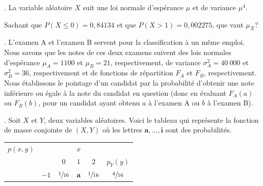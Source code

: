 \begin{questions}


\newpage . \newpage
\question[10] \label{CDF} La variable aléatoire $X$ suit une loi normale d'espérance $\mu$ et de variance $\mu^4$.

Sachant que $P(X\leq 0)= 0,84134$ et que $P(X>1)=0,002275$, que vaut $\mu_X$?

\newpage . \newpage
\question
L'examen A et l'examen B servent pour la classification à un même emploi. 
Nous savons que les notes de ces deux examens suivent des lois normales d'espérance $\mu_{A}=1100$ et $\mu_{B}=21$, respectivement, de variance $\sigma^2_{A}=40\ 000$ et $\sigma^2_{B}=36$, respectivement et de fonctions de répartition $F_A$ et $F_B$, respectivement.
Nous établissons le pointage d'un candidat par la probabilité d'obtenir une note inférieure ou égale à la note du candidat en question (donc en évaluant $F_A(a)$ ou $F_B(b)$, pour un candidat ayant obtenu $a$ à l'examen A ou $b$ à l'examen B). 


\newpage . \newpage
  \question Soit $X$ et $Y$, deux variables aléatoires.
Voici le tableau qui représente la fonction de masse conjointe de $(X, Y)$ où les lettres $\boldsymbol{a},\hdots,\boldsymbol{i}$ sont des probabilités.

\begin{center}
\large{
\begin{tabular}{cc|ccc|c}
$p(x,y)$    &       &               & $x$ &     &\\
            &       & $0$           & $1$ & $2$ & $p_Y(y)$\\ 
 \hline
            & $-1$ & $\sfrac{1}{16}$ & $\boldsymbol{a}$  & $\sfrac{1}{16}$ &$\sfrac{4}{16}$\\


\end{tabular}}
\end{center}
\end{questions}
